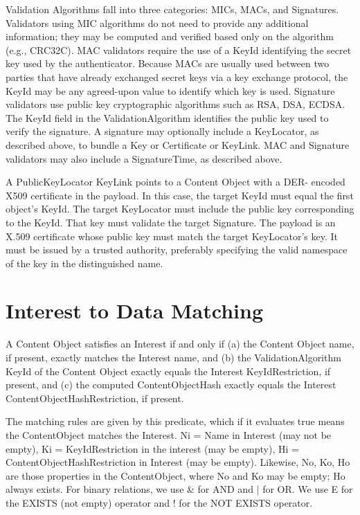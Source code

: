 \documentclass[12pt]{article}
\begin{document}
Validation Algorithms fall into three categories: MICs, MACs, and
Signatures.  Validators using MIC algorithms do not need to provide
any additional information; they may be computed and verified based
only on the algorithm (e.g., CRC32C).  MAC validators require the use
of a KeyId identifying the secret key used by the authenticator.
Because MACs are usually used between two parties that have already
exchanged secret keys via a key exchange protocol, the KeyId may be
any agreed-upon value to identify which key is used.  Signature
validators use public key cryptographic algorithms such as RSA, DSA,
ECDSA.  The KeyId field in the ValidationAlgorithm identifies the
public key used to verify the signature.  A signature may optionally
include a KeyLocator, as described above, to bundle a Key or
Certificate or KeyLink.  MAC and Signature validators may also
include a SignatureTime, as described above.

A PublicKeyLocator KeyLink points to a Content Object with a DER-
encoded X509 certificate in the payload.  In this case, the target
KeyId must equal the first object's KeyId.  The target KeyLocator
must include the public key corresponding to the KeyId.  That key
must validate the target Signature.  The payload is an X.509
certificate whose public key must match the target KeyLocator's key.
It must be issued by a trusted authority, preferably specifying the
valid namespace of the key in the distinguished name.

\section{Interest to Data Matching}
A Content Object satisfies an Interest if and only if (a) the Content
Object name, if present, exactly matches the Interest name, and (b)
the ValidationAlgorithm KeyId of the Content Object exactly equals
the Interest KeyIdRestriction, if present, and (c) the computed
ContentObjectHash exactly equals the Interest
ContentObjectHashRestriction, if present.

The matching rules are given by this predicate, which if it evaluates
true means the ContentObject matches the Interest.  Ni = Name in
Interest (may not be empty), Ki = KeyIdRestriction in the interest
(may be empty), Hi = ContentObjectHashRestriction in Interest (may be
empty).  Likewise, No, Ko, Ho are those properties in the
ContentObject, where No and Ko may be empty; Ho always exists.  For
binary relations, we use \& for AND and | for OR.  We use E for the
EXISTS (not empty) operator and ! for the NOT EXISTS operator.
\end{document}
